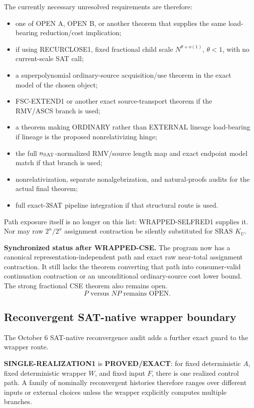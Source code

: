 \documentclass[11pt]{article}
\newcommand{\statusproved}{\textcolor{proved}{\textbf{PROVED/EXACT}}}
\theoremstyle{plain}
\theoremstyle{definition}
\theoremstyle{remark}
\begin{document}
The currently necessary unresolved requirements are therefore:
\begin{itemize}[leftmargin=1.4em]
\item one of OPEN A, OPEN B, or another theorem that supplies the same
load-bearing reduction/cost implication;
\item if using RECURCLOSE1, fixed fractional child scale
\(N^{\theta+o(1)}\), \(\theta<1\), with no current-scale SAT call;
\item a superpolynomial ordinary-source acquisition/use theorem in the exact
model of the chosen object;
\item FSC-EXTEND1 or another exact source-transport theorem if the RMV/ASCS
branch is used;
\item a theorem making ORDINARY rather than EXTERNAL lineage load-bearing if
lineage is the proposed nonrelativizing hinge;
\item the full \(n_{\rm SAT}\)-normalized RMV/source length map and exact
endpoint model match if that branch is used;
\item nonrelativization, separate nonalgebrization, and natural-proofs audits
for the actual final theorem;
\item full exact-3SAT pipeline integration if that structural route is used.
\end{itemize}

Path exposure itself is no longer on this list: WRAPPED-SELFRED1 supplies it.
Nor may raw \(2^n/2^x\) assignment contraction be silently substituted for
SRAS \(K_U\).

\begin{statusbox}
\textbf{Synchronized status after WRAPPED-CSE.}
The program now has a canonical representation-independent path and exact raw
near-total assignment contraction.  It still lacks the theorem converting
that path into consumer-valid continuation contraction or an unconditional
ordinary-source cost lower bound.  The strong fractional CSE theorem also
remains open.
\[
\boxed{\text{$P$ versus $NP$ remains OPEN.}}
\]
\end{statusbox}

\subsection{Reconvergent SAT-native wrapper boundary}

The October 6 SAT-native reconvergence audit adds a further exact guard to
the wrapper route.

\textbf{SINGLE-REALIZATION1} is \statusproved: for fixed deterministic
\(A\), fixed deterministic wrapper \(W\), and fixed input \(F\), there is one
realized control path.  A family of nominally reconvergent histories therefore
ranges over different inputs or external choices unless the wrapper explicitly
computes multiple branches.
\end{document}
